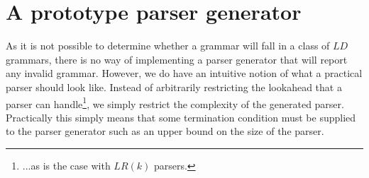 \documentclass[A4]{sig-alternate}
\begin{document}
%
%
%
%



\section{A prototype parser generator}

As it is not possible to determine whether a grammar will fall in a class of $LD$ grammars,
there is no way of implementing a parser generator that will report any invalid grammar.
However, we do have an intuitive notion of what a practical parser should look like.
Instead of arbitrarily restricting the lookahead that a parser can handle\footnote{...as is the case with $LR(k)$ parsers.},
we simply restrict the complexity of the generated parser.
Practically this simply means that some termination condition must be supplied to the parser generator such as an upper bound on the size of the parser.
\end{document}
